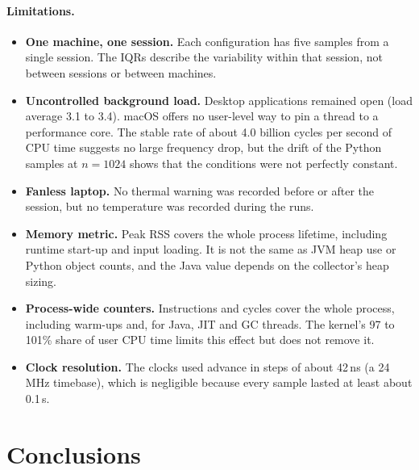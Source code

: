 \documentclass[11pt,a4paper]{article}
\begin{document}
\paragraph{Limitations.}
\begin{itemize}
  \item \textbf{One machine, one session.} Each configuration has five samples
  from a single session. The IQRs describe the variability within that session,
  not between sessions or between machines.
  \item \textbf{Uncontrolled background load.} Desktop applications remained
  open (load average 3.1 to 3.4). macOS offers no user-level way to pin a
  thread to a performance core. The stable rate of about 4.0 billion cycles per
  second of CPU time suggests no large frequency drop, but the drift of the
  Python samples at $n=1024$ shows that the conditions were not perfectly
  constant.
  \item \textbf{Fanless laptop.} No thermal warning was recorded before or after
  the session, but no temperature was recorded during the runs.
  \item \textbf{Memory metric.} Peak RSS covers the whole process lifetime,
  including runtime start-up and input loading. It is not the same as JVM heap
  use or Python object counts, and the Java value depends on the collector's
  heap sizing.
  \item \textbf{Process-wide counters.} Instructions and cycles cover the whole
  process, including warm-ups and, for Java, JIT and GC threads. The kernel's
  97 to 101\% share of user CPU time limits this effect but does not remove it.
  \item \textbf{Clock resolution.} The clocks used advance in steps of about
  42\,ns (a 24\,MHz timebase), which is negligible because every sample lasted at least about 0.1\,s.
\end{itemize}

\section{Conclusions}
\label{sec:conclusions}
\end{document}
